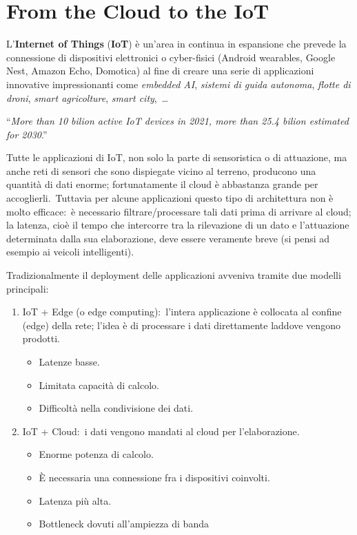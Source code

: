\chapter{From the Cloud to the IoT}

L'\textbf{Internet of Things} (\textbf{IoT}) è un'area in continua in espansione che prevede la connessione di dispositivi elettronici o cyber-fisici (Android wearables, Google Nest, Amazon Echo, Domotica) al fine di creare una serie di applicazioni innovative impressionanti come \textit{embedded AI}, \textit{sistemi di guida autonoma}, \textit{flotte di droni}, \textit{smart agricolture}, \textit{smart city},\ \dots

\vspace{12pt}
\noindent``\textit{More than 10 bilion active IoT devices in 2021, more than 25.4 bilion estimated for 2030}.''
\vspace{12pt}

\noindent Tutte le applicazioni di IoT, non solo la parte di sensoristica o di attuazione, ma anche reti di sensori che sono dispiegate vicino al terreno, producono una quantità di dati enorme; fortunatamente il cloud è abbastanza grande per accoglierli.\
Tuttavia per alcune applicazioni questo tipo di architettura non è molto efficace:\ è necessario filtrare/processare tali dati prima di arrivare al cloud; la latenza, cioè il tempo che intercorre tra la rilevazione di un dato e l'attuazione determinata dalla sua elaborazione, deve essere veramente breve (si pensi ad esempio ai veicoli intelligenti).

Tradizionalmente il deployment delle applicazioni avveniva tramite due modelli principali:

\begin{enumerate}
	\item IoT + Edge (o edge computing):\ l'intera applicazione è collocata al confine (edge) della rete; l'idea è di processare i dati direttamente laddove vengono prodotti.\
	      \begin{itemize}
		      \item Latenze basse.
		      \item Limitata capacità di calcolo.
		      \item Difficoltà nella condivisione dei dati.
	      \end{itemize}
	\item IoT + Cloud:\ i dati vengono mandati al cloud per l'elaborazione.
	      \begin{itemize}
		      \item Enorme potenza di calcolo.
		      \item È necessaria una connessione fra i dispositivi coinvolti.
		      \item Latenza più alta.
		      \item Bottleneck dovuti all'ampiezza di banda
	      \end{itemize}
\end{enumerate}

